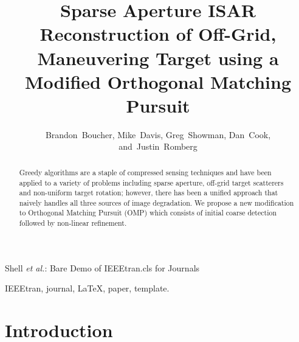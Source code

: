 \documentclass[journal]{IEEEtran}
\begin{document}
\title{Sparse Aperture ISAR Reconstruction of Off-Grid, Maneuvering Target using a Modified Orthogonal Matching Pursuit}

\author{Brandon~Boucher,
        Mike~Davis,
        Greg~Showman,
        Dan~Cook,
        and~Justin~Romberg%
}

%
{Shell \MakeLowercase{\textit{et al.}}: Bare Demo of IEEEtran.cls for Journals}
% 

\maketitle

\begin{abstract}
Greedy algorithms are a staple of compressed sensing techniques and have been applied to a variety of problems including sparse aperture, off-grid target scatterers and non-uniform target rotation; however, there has been a unified approach that naively handles all three sources of image degradation. We propose a new modification to Orthogonal Matching Pursuit (OMP) which consists of initial coarse detection followed by non-linear refinement.
\end{abstract}

\begin{IEEEkeywords}
IEEEtran, journal, \LaTeX, paper, template.
\end{IEEEkeywords}

\IEEEpeerreviewmaketitle


\section{Introduction}
\end{document}
